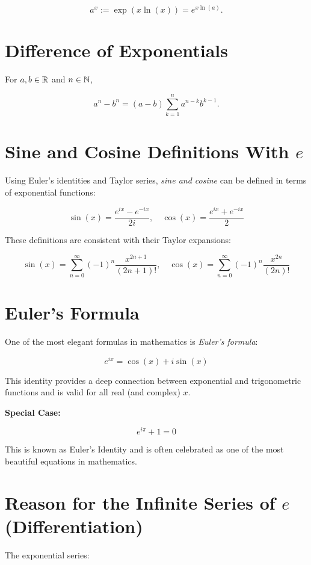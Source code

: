 \[
    a^x := \exp(x \ln(x)) = e^{x \ln(a)}.
\]

\section{Difference of Exponentials}

For \(a,b \in \mathbb{R}\) and \(n \in \mathbb{N}\),

\[
    a^n - b^n = (a - b) \sum_{k = 1}^{n} a^{n - k} b^{k - 1}.
\]

\section{Sine and Cosine Definitions With \texorpdfstring{\(e\)}{e}}

Using Euler's identities and Taylor series, \emph{sine and cosine} can be defined in terms of exponential 
functions:

\[
    \sin(x) = \frac{e^{ix} - e^{-ix}}{2i}, \quad
    \cos(x) = \frac{e^{ix} + e^{-ix}}{2}
\]

These definitions are consistent with their Taylor expansions:

\[
    \sin(x) = \sum_{n=0}^{\infty} {(-1)}^n \frac{x^{2n+1}}{(2n+1)!}, \quad
    \cos(x) = \sum_{n=0}^{\infty} {(-1)}^n \frac{x^{2n}}{(2n)!}
\]

\section{Euler's Formula}

One of the most elegant formulas in mathematics is \emph{Euler's formula}:

\[
    e^{ix} = \cos(x) + i\sin(x)
\]

This identity provides a deep connection between exponential and trigonometric functions and is valid 
for all real (and complex) \(x\).

\textbf{Special Case:}

\[
    e^{i\pi} + 1 = 0
\]

This is known as Euler's Identity and is often celebrated as one of the most beautiful equations in 
mathematics.

\section{Reason for the Infinite Series of \texorpdfstring{\(e\)}{e} (Differentiation)}

The exponential series:


